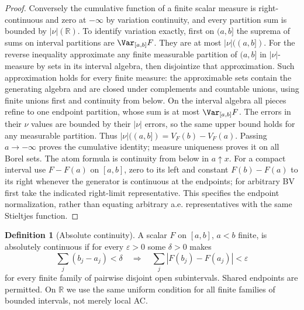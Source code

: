 \documentclass[11pt,oneside,openany]{book}
\theoremstyle{definition}
\newtheorem{definition}[theorem]{Definition}
\theoremstyle{remark}
\newcommand{\R}{\mathbb R}\newcommand{\C}{\mathbb C}
\newcommand{\eps}{\varepsilon}\newcommand{\ee}{\varepsilon}
\newcommand{\family}[1]{}
\begin{document}
\begin{proof}
Conversely the cumulative function of a finite scalar measure is
right-continuous and zero at $-\infty$ by variation continuity, and every
partition sum is bounded by $|\nu|(\R)$. To identify variation exactly,
first on $(a,b]$ the suprema of sums on interval partitions are
$\Var_{[a,b]}F$. They are at most $|\nu|((a,b])$.
For the reverse inequality approximate any finite measurable partition
of $(a,b]$ in $|\nu|$-measure by sets in its interval algebra, then
disjointize that approximation. Such approximation holds for every finite
measure: the approximable sets contain the generating algebra and are
closed under complements and countable unions, using finite unions first
and continuity from below. On the interval algebra all pieces refine to
one endpoint partition, whose sum is at most $\Var_{[a,b]}F$.
The errors in their $\nu$ values are bounded by their $|\nu|$ errors,
so the same upper bound holds for any measurable partition. Thus
$|\nu|((a,b])=V_F(b)-V_F(a)$. Passing $a\to-\infty$ proves the
cumulative identity; measure uniqueness proves it on all Borel sets.
The atom formula is continuity from below in $a\uparrow x$.
For a compact interval use $F-F(a)$ on $[a,b]$, zero to its left and
constant $F(b)-F(a)$ to its right whenever the generator is continuous
at the endpoints; for arbitrary BV first take the indicated right-limit
representative. This specifies the endpoint normalization, rather than
equating arbitrary a.e. representatives with the same Stieltjes function.
\end{proof}

\begin{definition}[Absolute continuity]\family{D11.12.ac_definition}\label{d11:12:ac-definition}
A scalar $F$ on $[a,b]$, $a<b$ finite, is absolutely continuous if for
every $\eps>0$ some $\delta>0$ makes
\[
 \sum_j(b_j-a_j)<\delta\quad\Longrightarrow\quad
 \sum_j|F(b_j)-F(a_j)|<\eps
\]
for every finite family of pairwise disjoint open subintervals.
Shared endpoints are permitted. On $\R$ we use the same uniform condition
for all finite families of bounded intervals, not merely local AC.
\end{definition}
\end{document}
